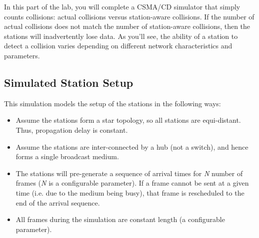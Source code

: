 \documentclass[11pt]{article}
\begin{document}
In this part of the lab, you will complete a CSMA/CD simulator that simply counts collisions: actual collisions versus station-aware collisions.
If the number of actual collisions does not match the number of station-aware collisions, then the stations will inadvertently lose data.
As you'll see, the ability of a station to detect a collision varies depending on different network characteristics and parameters.


\subsection{Simulated Station Setup}
\label{subsec:station-setup}
This simulation models the setup of the stations in the following ways:
\begin{itemize}
    \item Assume the stations form a star topology, so all stations are equi-distant. Thus, propagation delay is constant.
    \item Assume the stations are inter-connected by a hub (not a switch), and hence forms a single broadcast medium.
    \item The stations will pre-generate a sequence of arrival times for \textit{N} number of frames (\textit{N} is a configurable parameter). If a frame cannot be sent at a given time (i.e. due to the medium being busy), that frame is rescheduled to the end of the arrival sequence.
    \item All frames during the simulation are constant length (a configurable parameter).
\end{itemize}

\end{document}

